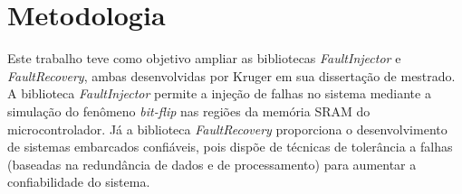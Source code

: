 
\chapter{Metodologia} \label{cap:metodologia}


Este trabalho teve como objetivo ampliar as bibliotecas \textit{FaultInjector} e \textit{FaultRecovery}, ambas desenvolvidas por Kruger \cite{Kruger:2014} em sua dissertação de mestrado. A biblioteca \textit{FaultInjector} permite a injeção de falhas no sistema mediante a simulação do fenômeno \textit{bit-flip} nas regiões da memória SRAM do microcontrolador. Já a biblioteca \textit{FaultRecovery} proporciona o desenvolvimento de sistemas embarcados confiáveis, pois dispõe de técnicas de tolerância a falhas (baseadas na redundância de dados e de processamento) para aumentar a confiabilidade do sistema.



